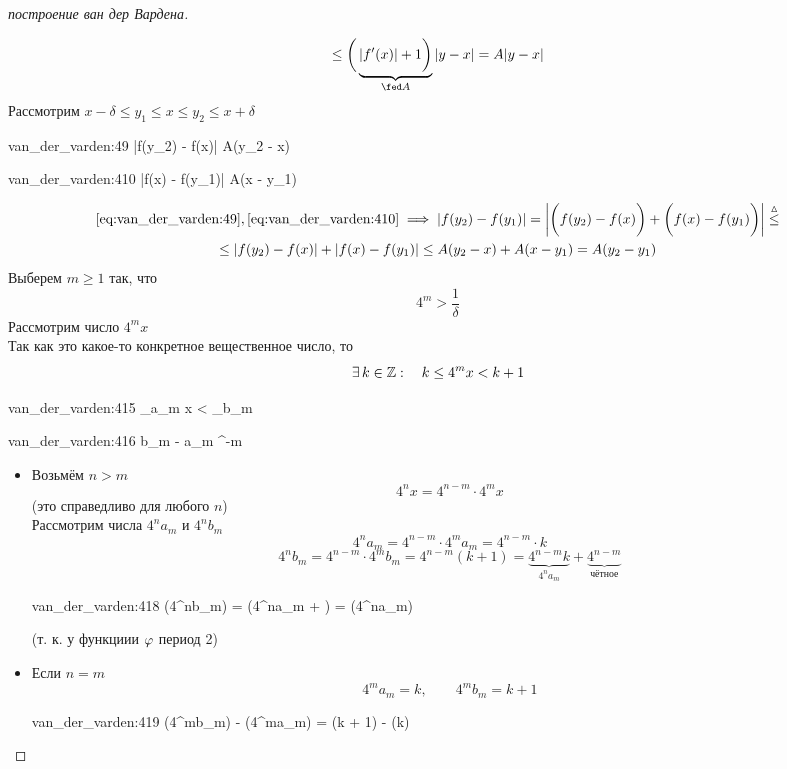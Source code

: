 \begin{proof}[построение ван дер Вардена]
\begin{itemize}
\begin{multline}
			\le \bigg( \underbrace{|f'(x)| + 1 \bigg)}_{\fed A}|y - x| = A|y - x|
		\end{multline}
		Рассмотрим $ x - \delta \le y_1 \le x \le y_2 \le x + \delta $
		\begin{equ}{van_der_varden:49}
			 \implies |f(y_2) - f(x)| \le A(y_2 - x)
		\end{equ}
		\begin{equ}{van_der_varden:410}
			 \implies |f(x) - f(y_1)| \le A(x - y_1)
		\end{equ}
		\begin{multline*}
			\eref{van_der_varden:49}, \eref{van_der_varden:410} \implies |f(y_2) - f(y_1)| = \bigg| \bigg( f(y_2) - f(x) \bigg) + \bigg( f(x) - f(y_1) \bigg) \bigg| \trile \\
			\le |f(y_2) - f(x)| + |f(x) - f(y_1)| \le A(y_2 - x) + A(x - y_1) = A(y_2 - y_1)
		\end{multline*}
		Выберем $ m \ge 1 $ так, что
		$$ 4^m > \frac1\delta $$
		Рассмотрим число $ 4^mx $ \\
		Так как это какое-то конкретное вещественное число, то
		$$ \exists\, k \in \mathbb{Z} : \quad k \le 4^mx < k + 1 $$
		\begin{equ}{van_der_varden:415}
			\implies {}_{\fed a_m} \le x < _{\fed b_m}
		\end{equ}
		\begin{equ}{van_der_varden:416}
			b_m - a_m ^{-m}
		\end{equ}
		\begin{itemize}
			\item Возьмём $ n > m $
			$$ 4^nx = 4^{n - m} \cdot 4^mx $$
			(это справедливо для любого $ n $) \\
			Рассмотрим числа $ 4^na_m $ и $ 4^nb_m $
			$$ 4^na_m = 4^{n - m} \cdot 4^ma_m = 4^{n - m} \cdot k $$
			$$ 4^nb_m = 4^{n - m} \cdot 4^mb_m = 4^{n - m}(k + 1) = \underbrace{4^{n - m}k}_{4^na_m} + \underbrace{4^{n - m}}_{\text{чётное}} $$
			\begin{equ}{van_der_varden:418}
				\implies \vphi(4^nb_m) = \vphi(4^na_m + ) = \vphi(4^na_m)
			\end{equ}
			(т. к. у функциии $ \varphi $ период 2)
			\item Если $ n = m $
			$$ 4^ma_m = k, \qquad 4^mb_m = k + 1 $$
			\begin{equ}{van_der_varden:419}
				\vphi(4^mb_m) - \vphi(4^ma_m) = \vphi(k + 1) - \vphi(k)
			\end{equ}

\end{itemize}
\end{itemize}
\end{proof}
